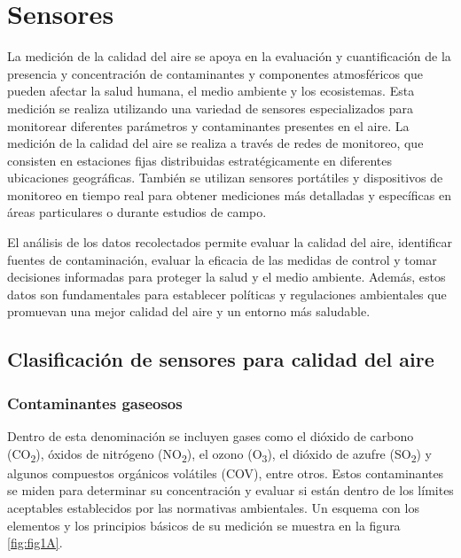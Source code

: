 \chapter{Sensores}
La medición de la calidad del aire se apoya en la evaluación y cuantificación de la presencia y concentración de contaminantes y componentes atmosféricos que pueden afectar la salud humana, el medio ambiente y los ecosistemas. Esta medición se realiza utilizando una variedad de sensores especializados para monitorear diferentes parámetros y contaminantes presentes en el aire. La medición de la calidad del aire se realiza a través de redes de monitoreo, que consisten en estaciones fijas distribuidas estratégicamente en diferentes ubicaciones geográficas. También se utilizan sensores portátiles y dispositivos de monitoreo en tiempo real para obtener mediciones más detalladas y específicas en áreas particulares o durante estudios de campo.

El análisis de los datos recolectados permite evaluar la calidad del aire, identificar fuentes de contaminación, evaluar la eficacia de las medidas de control y tomar decisiones informadas para proteger la salud y el medio ambiente. Además, estos datos son fundamentales para establecer políticas y regulaciones ambientales que promuevan una mejor calidad del aire y un entorno más saludable.

\section{Clasificación de sensores para calidad del aire}


\subsection{Contaminantes gaseosos}

Dentro de esta denominación se incluyen gases como el dióxido de carbono (CO\textsubscript{2}), óxidos de nitrógeno (NO\textsubscript{2}), el ozono (O\textsubscript{3}), el dióxido de azufre (SO\textsubscript{2}) y algunos compuestos orgánicos volátiles (COV), entre otros. Estos contaminantes se miden para determinar su concentración y evaluar si están dentro de los límites aceptables establecidos por las normativas ambientales. Un esquema con los elementos y los principios básicos de su medición se muestra en la figura \ref{fig:fig1A}.

